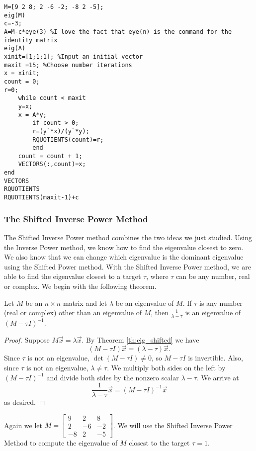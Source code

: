 \documentclass{ximera}
\begin{document}
\begin{verbatim}
M=[9 2 8; 2 -6 -2; -8 2 -5];
eig(M)
c=-3;
A=M-c*eye(3) %I love the fact that eye(n) is the command for the identity matrix
eig(A)
xinit=[1;1;1]; %Input an initial vector
maxit =15; %Choose number iterations
x = xinit;
count = 0;
r=0;
    while count < maxit
    y=x;
    x = A*y;
        if count > 0; 
        r=(y`*x)/(y`*y);
        RQUOTIENTS(count)=r;
        end
    count = count + 1;
    VECTORS(:,count)=x;
end
VECTORS
RQUOTIENTS
RQUOTIENTS(maxit-1)+c
\end{verbatim}

\subsubsection*{The Shifted Inverse Power Method}

The Shifted Inverse Power method combines the two ideas we just studied.  Using the Inverse Power method, we know how to find the eigenvalue closest to zero.  We also know that we can change which eigenvalue is the dominant eigenvalue using the Shifted Power method.  With the Shifted Inverse Power method, we are able to find the eigenvalue closest to a target $\tau$, where $\tau$ can be any number, real or complex.    We begin with the following theorem.

\begin{theorem}\label{th:eig_shifted_inverse}
Let $M$ be an $n \times n$ matrix and let $\lambda$ be an eigenvalue of $M$.  If $\tau$ is any number (real or complex) other than an eigenvalue of $M$, then $\frac{1}{\lambda - \tau}$ is an eigenvalue of $(M - \tau I)^{-1}$.
\end{theorem}

\begin{proof}
Suppose $M\vec{x}=\lambda\vec{x}$.  By Theorem \ref{th:eig_shifted} we have 
$$(M - \tau I)\vec{x}=(\lambda-\tau)\vec{x}.$$  
Since $\tau$ is not an eigenvalue, $\det (M - \tau I) \ne 0$, so $M - \tau I$ is invertible.  Also, since $\tau$ is not an eigenvalue, $\lambda \ne \tau$.  We multiply both sides on the left by $(M - \tau I)^{-1}$ and divide both sides by the nonzero scalar $\lambda - \tau$.  We arrive at 
$$\frac{1}{\lambda - \tau}\vec{x} = (M - \tau I)^{-1}\vec{x}$$
as desired.
\end{proof}

Again we let $M=\left[ \begin{array}{rrr}
9 & 2 & 8 \\
2 & -6 & -2 \\
-8 & 2 & -5
\end{array}\right]$.  We will use the Shifted Inverse Power Method to compute the eigenvalue of $M$ closest to the target $\tau = 1$. 
\end{document}
